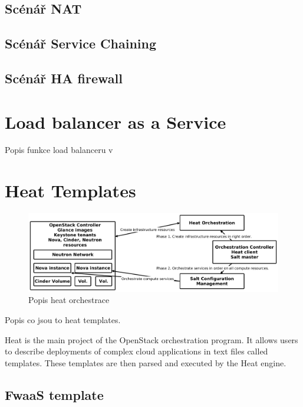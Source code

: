 \subsection{Scénář NAT}

\subsection{Scénář Service Chaining}

\subsection{Scénář HA firewall}


\section{Load balancer as a Service}

Popis funkce load balanceru v 


\section{Heat Templates}



\begin{figure}[h]
\begin{centering}
\includegraphics[scale=0.21]{images/heat}
\par\end{centering}
\caption{Popis heat orchestrace\label{fig:heat}}
\end{figure}

Popis co jsou to heat templates.

Heat is the main project of the OpenStack orchestration program. It allows users to describe deployments of complex cloud applications in text files called templates. These templates are then parsed and executed by the Heat engine.

\subsection{FwaaS template}

